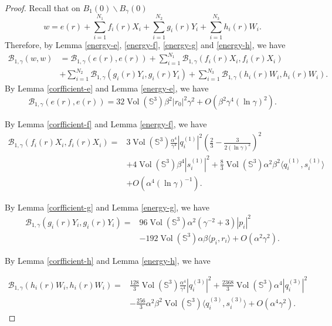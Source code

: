 \documentclass[11pt,letterpaper]{amsart}
\DeclareMathOperator{\Vol}{Vol}
\newcommand{\mB}{\mathcal{B}}
\newcommand{\bS}{\mathbb{S}}
\theoremstyle{definition}
\theoremstyle{remark}
\numberwithin{equation}{section}
\begin{document}
\begin{proof}
    Recall that on $B_1(0)\backslash B_{\gamma}(0)$
        \begin{equation*}
w=e(r)+\sum_{i=1}^{N_1}f_i(r)X_i+\sum_{i=1}^{N_2}g_i(r)Y_i+\sum_{i=1}^{N_3}h_i(r)W_i.
\end{equation*}
Therefore, by Lemma \ref{energy-e}, \ref{energy-f}, \ref{energy-g} and \ref{energy-h}, we have
\begin{equation*}
    \begin{split}
        \mB_{1, \gamma}(w,w)&=\mB_{1, \gamma}(e(r),e(r))+\sum_{i=1}^{N_1}\mB_{1, \gamma}(f_i(r)X_i,f_i(r)X_i)\\
        &+\sum_{i=1}^{N_2}\mB_{1, \gamma}(g_i(r)Y_i,g_i(r)Y_i)+\sum_{i=1}^{N_3}\mB_{1, \gamma}(h_i(r)W_i,h_i(r)W_i).
    \end{split}
\end{equation*}
By Lemma \ref{corfficient-e} and Lemma \ref{energy-e}, we have
\begin{equation*}
    \mB_{1, \gamma}(e(r),e(r))=32\Vol(\bS^3)\beta^2|r_0|^2\gamma^2+O(\beta^2\gamma^4(\ln \gamma)^2).
\end{equation*}

By Lemma \ref{corfficient-f} and Lemma \ref{energy-f}, we have
\begin{equation*}
\begin{split}
    \mB_{1, \gamma}(f_i(r)X_i,f_i(r)X_i)=&3\Vol(\bS^3)\frac{\alpha^4}{\gamma^4}|q^{(1)}_i|^2\left(\frac{2}{3}-\frac{3}{2(\ln \gamma)^2}\right)^2\\
    &+4\Vol(\bS^3)\beta^4|s^{(1)}_i|^2+\frac{8}{3}\Vol(\bS^3)\alpha^2\beta^2 \langle q^{(1)}_i, s^{(1)}_i\rangle \\
    &+O(\alpha^4(\ln \gamma)^{-1}).
    \end{split}
\end{equation*}

By Lemma \ref{corfficient-g} and Lemma \ref{energy-g}, we have
\begin{equation*}
\begin{split}
   \mB_{1, \gamma}(g_i(r)Y_i,g_i(r)Y_i)=&96\Vol(\bS^3) \alpha^2\left(\gamma^{-2}+3\right)|p_i|^2\\
   &-192\Vol(\bS^3)\alpha\beta \langle p_i, r_i\rangle+O(\alpha^2 \gamma^2).
   \end{split}
\end{equation*}

By Lemma \ref{corfficient-h} and Lemma \ref{energy-h}, we have

\begin{equation*}
\begin{split}
\mB_{1, \gamma}(h_i(r)W_i,h_i(r)W_i)=&\frac{128}{3}\Vol(\bS^3)\frac{\alpha^4}{\gamma^4}|q^{(3)}_i|^2+\frac{2368}{3}\Vol(\bS^3)\alpha^4|q^{(3)}_i|^2\\
&-\frac{256}{3}\alpha^2\beta^2\Vol(\bS^3)\langle q^{(3)}_i, s^{(3)}_i\rangle+O(\alpha^4\gamma^2).
\end{split}
\end{equation*}


\end{proof}
\end{document}
